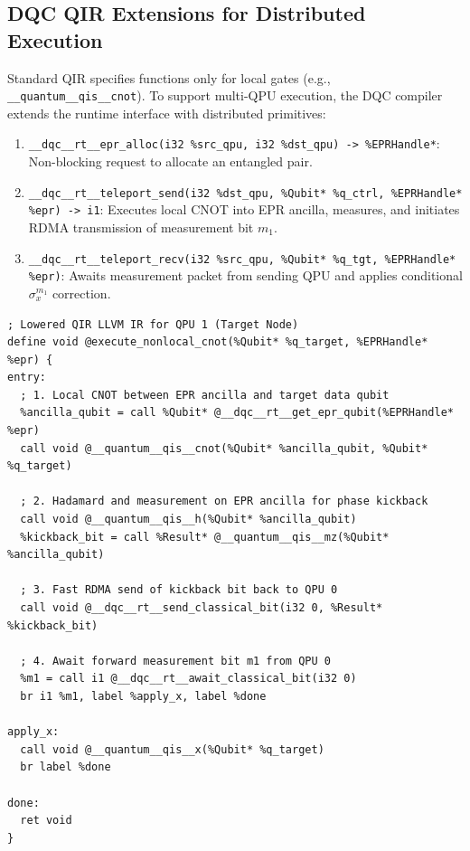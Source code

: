 \subsection{DQC QIR Extensions for Distributed Execution}
Standard QIR specifies functions only for local gates (e.g., \texttt{\_\_quantum\_\_qis\_\_cnot}). To support multi-QPU execution, the DQC compiler extends the runtime interface with distributed primitives:
\begin{enumerate}
    \item \texttt{\_\_dqc\_\_rt\_\_epr\_alloc(i32 \%src\_qpu, i32 \%dst\_qpu) -> \%EPRHandle*}: Non-blocking request to allocate an entangled pair.
    \item \texttt{\_\_dqc\_\_rt\_\_teleport\_send(i32 \%dst\_qpu, \%Qubit* \%q\_ctrl, \%EPRHandle* \%epr) -> i1}: Executes local CNOT into EPR ancilla, measures, and initiates RDMA transmission of measurement bit $m_1$.
    \item \texttt{\_\_dqc\_\_rt\_\_teleport\_recv(i32 \%src\_qpu, \%Qubit* \%q\_tgt, \%EPRHandle* \%epr)}: Awaits measurement packet from sending QPU and applies conditional $\sigma_x^{m_1}$ correction.
\end{enumerate}

\begin{lstlisting}[language=MLIR, caption={Generated QIR LLVM Assembly for Distributed CNOT Receiver}]
; Lowered QIR LLVM IR for QPU 1 (Target Node)
define void @execute_nonlocal_cnot(%Qubit* %q_target, %EPRHandle* %epr) {
entry:
  ; 1. Local CNOT between EPR ancilla and target data qubit
  %ancilla_qubit = call %Qubit* @__dqc__rt__get_epr_qubit(%EPRHandle* %epr)
  call void @__quantum__qis__cnot(%Qubit* %ancilla_qubit, %Qubit* %q_target)
  
  ; 2. Hadamard and measurement on EPR ancilla for phase kickback
  call void @__quantum__qis__h(%Qubit* %ancilla_qubit)
  %kickback_bit = call %Result* @__quantum__qis__mz(%Qubit* %ancilla_qubit)
  
  ; 3. Fast RDMA send of kickback bit back to QPU 0
  call void @__dqc__rt__send_classical_bit(i32 0, %Result* %kickback_bit)
  
  ; 4. Await forward measurement bit m1 from QPU 0
  %m1 = call i1 @__dqc__rt__await_classical_bit(i32 0)
  br i1 %m1, label %apply_x, label %done

apply_x:
  call void @__quantum__qis__x(%Qubit* %q_target)
  br label %done

done:
  ret void
}
\end{lstlisting}

